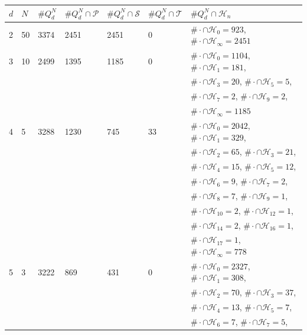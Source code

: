 \documentclass[12pt]{article}
\theoremstyle{plain}
\theoremstyle{remark}
\begin{document}
\begin{table}
\begin{tabular}{lllllll}
$d$ & $N$ & $\# Q_{d}^N$ & $\# Q_{d}^N \cap \mathcal{P} $& $\# Q_{d}^N \cap \mathcal{S} $& $\# Q_{d}^N \cap \mathcal{T} $& $\# Q_{d}^N \cap \mathcal{H}_n $\\ \hline 
2& 50 &  3374&  2451&  2451&  0 & $\# \cdot \cap \mathcal{H}_{0} = 923$, $\# \cdot \cap \mathcal{H}_{\infty} = 2451$ \\ \hline 
3& 10 &  2499&  1395&  1185&  0 & $\# \cdot \cap \mathcal{H}_{0} = 1104$, $\# \cdot \cap \mathcal{H}_{1} = 181$, \\ 
 &&&&&& $\# \cdot \cap \mathcal{H}_{3} = 20$, $\# \cdot \cap \mathcal{H}_{5} = 5$, \\ 
 &&&&&& $\# \cdot \cap \mathcal{H}_{7} = 2$, $\# \cdot \cap \mathcal{H}_{9} = 2$, \\ 
 &&&&&& $\# \cdot \cap \mathcal{H}_{\infty} = 1185$ \\ \hline 
4& 5 &  3288&  1230&  745&  33 & $\# \cdot \cap \mathcal{H}_{0} = 2042$, $\# \cdot \cap \mathcal{H}_{1} = 329$, \\ 
 &&&&&& $\# \cdot \cap \mathcal{H}_{2} = 65$, $\# \cdot \cap \mathcal{H}_{3} = 21$, \\ 
 &&&&&& $\# \cdot \cap \mathcal{H}_{4} = 15$, $\# \cdot \cap \mathcal{H}_{5} = 12$, \\ 
 &&&&&& $\# \cdot \cap \mathcal{H}_{6} = 9$, $\# \cdot \cap \mathcal{H}_{7} = 2$, \\ 
 &&&&&& $\# \cdot \cap \mathcal{H}_{8} = 7$, $\# \cdot \cap \mathcal{H}_{9} = 1$, \\ 
 &&&&&& $\# \cdot \cap \mathcal{H}_{10} = 2$, $\# \cdot \cap \mathcal{H}_{12} = 1$, \\ 
 &&&&&& $\# \cdot \cap \mathcal{H}_{14} = 2$, $\# \cdot \cap \mathcal{H}_{16} = 1$, \\ 
 &&&&&& $\# \cdot \cap \mathcal{H}_{17} = 1$, $\# \cdot \cap \mathcal{H}_{\infty} = 778$ \\ \hline 
5& 3 &  3222&  869&  431&  0 & $\# \cdot \cap \mathcal{H}_{0} = 2327$, $\# \cdot \cap \mathcal{H}_{1} = 308$, \\ 
 &&&&&& $\# \cdot \cap \mathcal{H}_{2} = 70$, $\# \cdot \cap \mathcal{H}_{3} = 37$, \\ 
 &&&&&& $\# \cdot \cap \mathcal{H}_{4} = 13$, $\# \cdot \cap \mathcal{H}_{5} = 7$, \\ 
 &&&&&& $\# \cdot \cap \mathcal{H}_{6} = 7$, $\# \cdot \cap \mathcal{H}_{7} = 5$, \\ 

\end{tabular}
\end{table}
\end{document}
